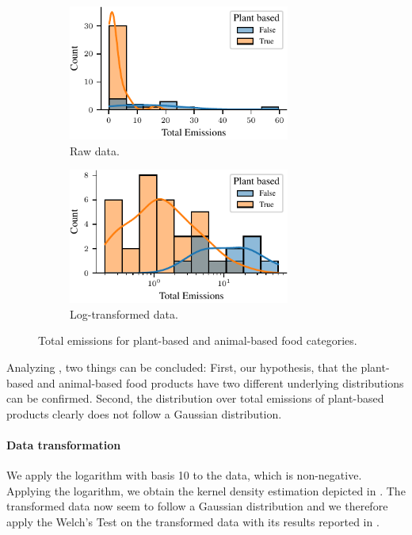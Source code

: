 \documentclass{article}
\begin{document}
\begin{figure}[h]
  \centering
  \begin{subfigure}[b]{0.49\textwidth}
    \centering
    \includegraphics[width=0.8\textwidth]{figures/emissions.pdf}
    \caption{Raw data.}
    \label{fig:emissions}
  \end{subfigure}%
  \hfill
  \begin{subfigure}[b]{0.49\textwidth}
    \centering
    \includegraphics[width=0.8\textwidth]{figures/emissions-log.pdf}
    \caption{Log-transformed data.}
    \label{fig:emissions-log}
  \end{subfigure}
  \caption{Total emissions for plant-based and animal-based food categories.}
  \label{fig:emissions}
\end{figure}

Analyzing , two things can be concluded: First, our hypothesis, that the plant-based and animal-based food products have two different underlying distributions can be confirmed. Second, the distribution over total emissions of plant-based products clearly does not follow a Gaussian distribution. 

\paragraph*{Data transformation}
We apply the logarithm with basis 10 to the data, which is non-negative. Applying the logarithm, we obtain the kernel density estimation depicted in .
The transformed data now seem to follow a  Gaussian distribution and we therefore apply the Welch's Test on the transformed data with its results reported in .
\end{document}
